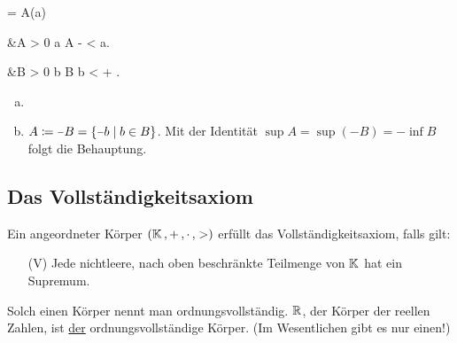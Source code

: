\documentclass[../ana1.tex]{subfiles}
\begin{document}
\begin{lem}\label{satz:epskrit_inf_sup}\leavevmode
		\begin{alignenum}{\alpha = \sup A}{(a)}
			\begin{aitem}
				 &\iff \alpha \geq A  \; \wedge  \; \forall \varepsilon > 0  \; \exists a \in A \colon  \; \alpha - \varepsilon < a.
			\end{aitem}\begin{aitem}
				 &\iff \beta  \leq B  \; \wedge  \; \forall \varepsilon > 0  \; \exists b \in B \colon  \; b < \beta + \varepsilon.
			\end{aitem}
		\end{alignenum}
\end{lem}
\begin{bew}\leavevmode
	\begin{enumerate}[(a)]
		\item {}
		\item \(A \coloneqq \minus B = \set{\minus b  \;\vert  \;b \in B} \). Mit der Identität
			  \(\sup A = \sup(\minus B) = \minus \inf B \) folgt die Behauptung.\qedhere
	\end{enumerate}
\end{bew}


\subsection{Das Vollständigkeitsaxiom}

\begin{defi}
	Ein angeordneter Körper \((\mathbb{K} \operatorname{,} + \operatorname{,} \cdot \operatorname{,} >) \) erfüllt das Voll\-ständig\-keits\-axiom, falls gilt:
	\begin{enumerate}
		\item[(V)]\label{ax:V}Jede nichtleere, nach oben beschränkte Teilmenge von \(\mathbb{K} \) hat ein Supremum.
	\end{enumerate}
	Solch einen Körper nennt man ordnungsvollständig. \(\mathbb{R} \), der Körper der reellen Zahlen, ist \underline{der} ordnungsvollständige Körper. (Im Wesentlichen gibt es nur einen!)
\end{defi}
\end{document}
